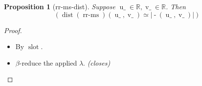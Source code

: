 \documentclass[11pt]{article}
\theoremstyle{plain}
\newtheorem{proposition}{Proposition}
\begin{document}
\begin{proposition}[rr-ms-dist]
Suppose $\operatorname{u\_} \in \mathbb{R}, \operatorname{v\_} \in \mathbb{R}$. Then
\begin{equation*}
(\operatorname{dist}(\operatorname{rr\text{-}ms})(\operatorname{u\_}, \operatorname{v\_}) \simeq \lvert \operatorname{\text{-}}(\operatorname{u\_}, \operatorname{v\_}) \rvert)
\end{equation*}

\end{proposition}

\begin{proof}
\begin{itemize}[leftmargin=2.8em, itemsep=4pt, parsep=1pt]
  \item[\textbf{4}] By $\operatorname{slot}$.
  \item[\textbf{5--6}] $\beta$-reduce the applied $\lambda$.  \emph{(closes)}
\end{itemize}
\end{proof}
\end{document}
